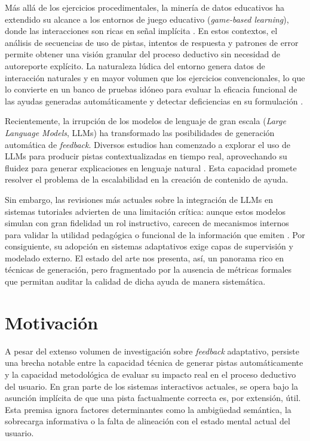 \documentclass[../main.tex]{subfiles}
\begin{document}
Más allá de los ejercicios procedimentales, la minería de datos educativos ha extendido su alcance a los entornos de juego educativo (\textit{game-based learning}), donde las interacciones son ricas en señal implícita \cite{Koedinger2012DataDrivenHints}. En estos contextos, el análisis de secuencias de uso de pistas, intentos de respuesta y patrones de error permite obtener una visión granular del proceso deductivo sin necesidad de autoreporte explícito. La naturaleza lúdica del entorno genera datos de interacción naturales y en mayor volumen que los ejercicios convencionales, lo que lo convierte en un banco de pruebas idóneo para evaluar la eficacia funcional de las ayudas generadas automáticamente y detectar deficiencias en su formulación \cite{VanLehn2006}.

Recientemente, la irrupción de los modelos de lenguaje de gran escala (\textit{Large Language Models}, LLMs) ha transformado las posibilidades de generación automática de \textit{feedback}. Diversos estudios han comenzado a explorar el uso de LLMs para producir pistas contextualizadas en tiempo real, aprovechando su fluidez para generar explicaciones en lenguaje natural \cite{tonga2024automaticgenerationquestionhints}. Esta capacidad promete resolver el problema de la escalabilidad en la creación de contenido de ayuda.

Sin embargo, las revisiones más actuales sobre la integración de LLMs en sistemas tutoriales advierten de una limitación crítica: aunque estos modelos simulan con gran fidelidad un rol instructivo, carecen de mecanismos internos para validar la utilidad pedagógica o funcional de la información que emiten \cite{Marquez-Carpintero_Lopez-Sellers_Cazorla_2025}. Por consiguiente, su adopción en sistemas adaptativos exige capas de supervisión y modelado externo. El estado del arte nos presenta, así, un panorama rico en técnicas de generación, pero fragmentado por la ausencia de métricas formales que permitan auditar la calidad de dicha ayuda de manera sistemática.


\section{Motivación}
A pesar del extenso volumen de investigación sobre \textit{feedback} adaptativo, persiste una brecha notable entre la capacidad técnica de generar pistas automáticamente y la capacidad metodológica de evaluar su impacto real en el proceso deductivo del usuario. En gran parte de los sistemas interactivos actuales, se opera bajo la asunción implícita de que una pista factualmente correcta es, por extensión, útil. Esta premisa ignora factores determinantes como la ambigüedad semántica, la sobrecarga informativa o la falta de alineación con el estado mental actual del usuario.
\end{document}
